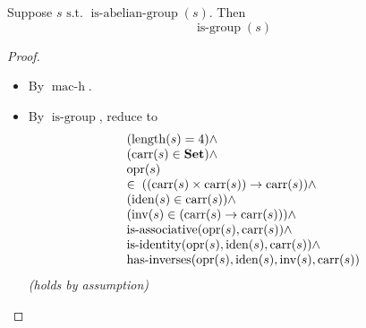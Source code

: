 \begin{proposition}
Suppose $s \text{ s.t. } \operatorname{is\text{-}abelian\text{-}group}(s)$. Then
\begin{equation*}
\operatorname{is\text{-}group}(s)
\end{equation*}

\end{proposition}

\begin{proof}
\begin{itemize}
  \item[\textbf{3}] By $\operatorname{mac\text{-}h}$.
  \item[\textbf{4--27}] By $\operatorname{is\text{-}group}$, reduce to
\begin{equation*}
\begin{array}{@{}l@{}} (\operatorname{length}(s) = 4) \wedge \\ (\operatorname{carr}(s) \in \mathbf{Set}) \wedge \\ \operatorname{opr}(s) \\ \in\; ((\operatorname{carr}(s) \times \operatorname{carr}(s)) \to \operatorname{carr}(s)) \wedge \\ (\operatorname{iden}(s) \in \operatorname{carr}(s)) \wedge \\ (\operatorname{inv}(s) \in (\operatorname{carr}(s) \to \operatorname{carr}(s))) \wedge \\ \operatorname{is\text{-}associative}(\operatorname{opr}(s), \operatorname{carr}(s)) \wedge \\ \operatorname{is\text{-}identity}(\operatorname{opr}(s), \operatorname{iden}(s), \operatorname{carr}(s)) \wedge \\ \operatorname{has\text{-}inverses}(\operatorname{opr}(s), \operatorname{iden}(s), \operatorname{inv}(s), \operatorname{carr}(s)) \end{array}
\end{equation*}
  \emph{(holds by assumption)}
\end{itemize}
\end{proof}
